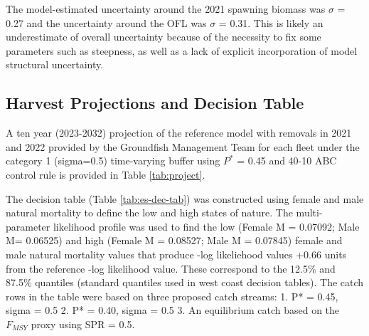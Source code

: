 \documentclass[11pt,
  english,
  a4paper,
]{article}
\begin{document}
\leavevmode\tagmcend\tagstructend


The model-estimated uncertainty around the 2021 spawning biomass was {\(\sigma\)\leavevmode\tagmcend\tagstructend} = 0.27 and the uncertainty around the OFL was {\(\sigma\)\leavevmode\tagmcend\tagstructend} = 0.31. This is likely an underestimate of overall uncertainty because of the necessity to fix some parameters such as steepness, as well as a lack of explicit incorporation of model structural uncertainty.

\leavevmode\tagmcend\tagstructend\par


\hypertarget{harvest-projections-and-decision-table}{%
\subsection*{Harvest Projections and Decision Table}\label{harvest-projections-and-decision-table}}

\leavevmode\tagmcend\tagstructend


A ten year (2023-2032) projection of the reference model with removals in 2021 and 2022 provided by the Groundfish Management Team for each fleet under the category 1 (sigma=0.5) time-varying buffer using {\(P^*\)\leavevmode\tagmcend\tagstructend} = 0.45 and 40-10 ABC control rule is provided in Table \ref{tab:project}.

\leavevmode\tagmcend\tagstructend\par




The decision table (Table \ref{tab:es-dec-tab}) was constructed using female and male natural mortality to define the low and high states of nature. The multi-parameter likelihood profile was used to find the low (Female M = 0.07092; Male M= 0.06525) and high (Female M = 0.08527; Male M = 0.07845) female and male natural mortality values that produce -log likeliehood values +0.66 units from the reference -log likelihood value. These correspond to the 12.5\% and 87.5\% quantiles (standard quantiles used in west coast decision tables). The catch rows in the table were based on three proposed catch streams: 1. P* = 0.45, sigma = 0.5 2. P* = 0.40, sigma = 0.5 3. An equilibrium catch based on the {\(F_{MSY}\)\leavevmode\tagmcend\tagstructend} proxy using SPR = 0.5.
\end{document}
